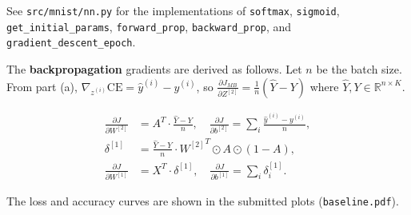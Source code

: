 \begin{answer}
See \texttt{src/mnist/nn.py} for the implementations of \texttt{softmax}, \texttt{sigmoid}, \texttt{get\_initial\_params}, \texttt{forward\_prop}, \texttt{backward\_prop}, and \texttt{gradient\_descent\_epoch}.

The \textbf{backpropagation} gradients are derived as follows. Let $n$ be the batch size. From part (a), $\nabla_{z^{(i)}} \mathrm{CE} = \hat{y}^{(i)} - y^{(i)}$, so $\frac{\partial J_{MB}}{\partial Z^{[2]}} = \frac{1}{n}(\hat{Y} - Y)$ where $\hat{Y}, Y \in \mathbb{R}^{n\times K}$.

\begin{align*}
\frac{\partial J}{\partial W^{[2]}} &= A^T \cdot \frac{\hat{Y}-Y}{n}, \quad \frac{\partial J}{\partial b^{[2]}} = \sum_i \frac{\hat{y}^{(i)}-y^{(i)}}{n},\\
\delta^{[1]} &= \frac{\hat{Y}-Y}{n} \cdot {W^{[2]}}^T \odot A \odot (1-A),\\
\frac{\partial J}{\partial W^{[1]}} &= X^T \cdot \delta^{[1]}, \quad \frac{\partial J}{\partial b^{[1]}} = \sum_i \delta^{[1]}_i.
\end{align*}

The loss and accuracy curves are shown in the submitted plots (\texttt{baseline.pdf}).
\end{answer}

